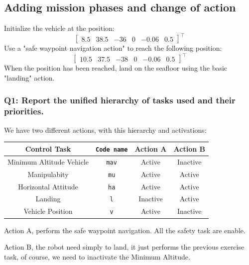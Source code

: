 \documentclass{article}
\begin{document}
\subsection{Adding mission phases and change of action}
Initialize the vehicle at the position:
\begin{displaymath}
\begin{bmatrix} 8.5 & 38.5 & -36 & 0 & -0.06 & 0.5 \end{bmatrix}^\top
\end{displaymath} 
Use a "safe waypoint navigation action" to reach the following position: 
\begin{displaymath}
\begin{bmatrix} 10.5 & 37.5 & -38 & 0 & -0.06 & 0.5 \end{bmatrix}^\top
\end{displaymath} 
When the position has been reached, land on the seafloor using the basic "landing" action.

\subsubsection{Q1: Report the unified hierarchy of tasks used and their priorities.}

We have two different actions, with this hierarchy and activations: 
\begin{center}
\begin{tabular}{ | c | c | c | c |}
\hline
 Control Task & \texttt{Code name} & Action A & Action B \\
\hline
 Minimum Altitude Vehicle &  \texttt{mav} & Active & Inactive  \\  
 Manipulabity &  \texttt{mu} & Active & Active  \\
 Horizontal Attitude &  \texttt{ha} & Active & Active \\
 Landing & \texttt{l} &Inactive & Active \\
 Vehicle Position &  \texttt{v} &Active & Inactive \\
 \hline
\end{tabular}
\end{center}

\begin{description}
\item Action A, perform the safe waypoint navigation. All the safety task are enable. 
\item Action B, the robot need simply to land, it just performs the previous exercise task, of course, we need to inactivate the Minimum Altitude.
\end{description}
 
\end{document}
